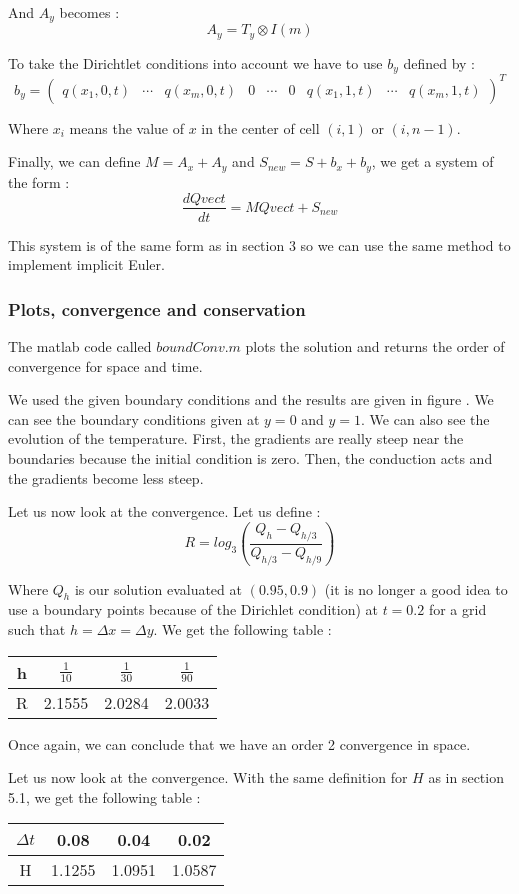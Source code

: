 And $A_y$ becomes : 
$$A_y = T_y \otimes I(m)$$

To take the Dirichtlet conditions into account we have to use $b_y$ defined by :
$$b_y = \left(\begin{array}{ccccccccc}
q(x_1,0,t) & \cdots & q(x_m,0,t) & 0 & \cdots & 0 & q(x_1,1,t) & \cdots & q(x_m,1,t)
\end{array}\right)^T $$

Where $x_i$ means the value of $x$ in the center of cell $(i,1)$ or $(i,n-1)$.

Finally, we can define $M=A_x+A_y$ and $S_{new}=S+b_x+b_y$, we get a system of the form :
$$\frac{dQvect}{dt}=MQvect+S_{new}$$

This system is of the same form as in section 3 so we can use the same method to implement implicit Euler.


\subsubsection{Plots, convergence and conservation}
The matlab code called $boundConv.m$ plots the solution and returns the order of convergence for space and time.

We used the given boundary conditions and the results are given in figure . We can see the boundary conditions given at $y=0$ and $y=1$. We can also see the evolution of the temperature. First, the gradients are really steep near the boundaries because the initial condition is zero. Then, the conduction acts and the gradients become less steep.

Let us now look at the convergence. Let us define : 
$$R = log_3(\frac{Q_h-Q_{h/3}}{Q_{h/3}-Q_{h/9}})$$

Where $Q_h$ is our solution evaluated at $(0.95,0.9)$ (it is no longer a good idea to use a boundary points because of the Dirichlet condition) at $t=0.2$ for a grid such that $h = \Delta x = \Delta y$. We get the following table : 
\begin{center}
\begin{tabular}{|c|c|c|c|}
\hline 
h & $\frac{1}{10}$ & $\frac{1}{30}$ & $\frac{1}{90}$ \\ 
\hline 
R & 2.1555 & 2.0284 & 2.0033 \\ 
\hline 
\end{tabular} 
\end{center}

Once again, we can conclude that we have an order 2 convergence in space.

Let us now look at the convergence. With the same definition for $H$ as in section 5.1, we get the following table :
\begin{center}
\begin{tabular}{|c|c|c|c|}
\hline 
$\Delta t$ & 0.08 & 0.04 & 0.02 \\ 
\hline 
H & 1.1255 & 1.0951 & 1.0587 \\ 
\hline 
\end{tabular} 
\end{center}

